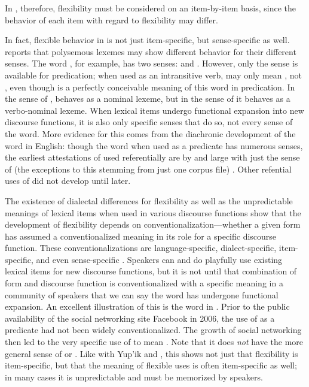 \noindent In , therefore, flexibility must be considered on an item-by-item basis, since the behavior of each item with regard to flexibility may differ.

In fact, flexible behavior in  is not just item-specific, but sense-specific as well. \textcite[54]{Creissels2017} reports that polysemous lexemes may show different behavior for their different senses. The word , for example, has two senses:  and . However, only the  sense is available for predication; when used as an intransitive verb,  may only mean , not , even though  is a perfectly conceivable meaning of this word in predication. In the sense of ,  behaves as a nominal lexeme, but in the sense of  it behaves as a verbo-nominal lexeme. When lexical items undergo functional expansion into new discourse functions, it is also only specific senses that do so, not every sense of the word. More evidence for this comes from the diachronic development of the word  in English: though the word  when used as a predicate has numerous senses, the earliest attestations of  used referentially are by and large with just the sense of  (the exceptions to this stemming from just one corpus file) \parencite[76]{Gries2006}. Other refential uses of  did not develop until later.

The existence of dialectal differences for flexibility as well as the unpredictable meanings of lexical items when used in various discourse functions show that the development of flexibility depends on conventionalization—whether a given form has assumed a conventionalized meaning in its role for a specific discourse function. These conventionalizations are language-specific, dialect-specific, item-specific, and even sense-specific \parencite[97]{Croft2000}. Speakers can and do playfully use existing lexical items for new discourse functions, but it is not until that combination of form and discourse function is conventionalized with a specific meaning in a community of speakers that we can say the word has undergone functional expansion. An excellent illustration of this is the word  in . Prior to the public availability of the social networking site Facebook in 2006, the use of  as a predicate had not been widely conventionalized. The growth of social networking then led to the very specific use of  to mean . Note that it does \emph{not} have the more general sense of  or . Like with Yup'ik and , this shows not just that flexibility is item-specific, but that the meaning of flexible uses is often item-specific as well; in many cases it is unpredictable and must be memorized by speakers.

